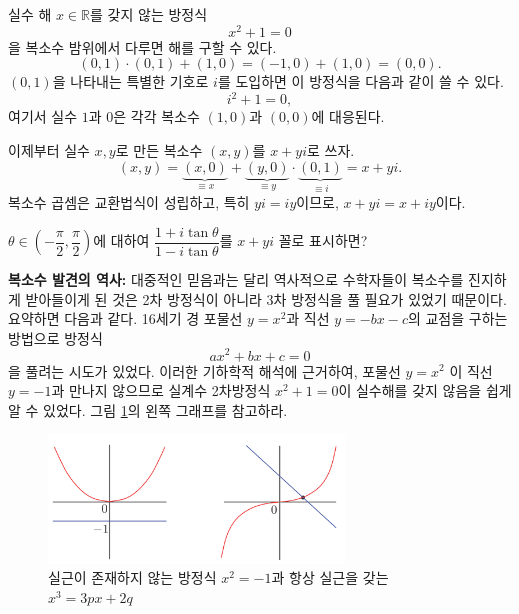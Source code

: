 실수 해 $x\in\mathbb R$를 갖지 않는 방정식
$$
x^2+1=0
$$
을 복소수 밤위에서 다루면 해를 구할 수 있다.
$$
(0,1)\cdot (0,1) + (1,0) = (-1,0) + (1,0) = (0,0).
$$
$(0,1)$을 나타내는 특별한 기호로 $i$를 도입하면 이 방정식을 다음과 같이 쓸 수 있다.
$$
i^2+1=0,
$$
여기서 실수 $1$과 $0$은 각각 복소수 $(1,0)$과 $(0,0)$에 대응된다.

이제부터 실수  $x,y$로 만든 복소수 $(x,y)$를 $x+yi$로 쓰자.
$$
(x,y) = \underbrace{(x,0)}_{\equiv x} +  \underbrace{(y,0)}_{\equiv y}
\cdot  \underbrace{(0,1)}_{\equiv i} = x+yi.
$$
복소수 곱셈은 교환법식이 성립하고, 특히 $yi = iy$이므로,
$x+yi = x+iy$이다.

\begin{salt_exercise} \label{ex-1-2}
$\theta \in \left(-\dfrac{\pi}2, \dfrac\pi2 \right)$에 대하여
$\dfrac{1+i\tan\theta}{1-i\tan\theta}$를 $x+yi$ 꼴로 표시하면?
\end{salt_exercise}

{\bf 복소수 발견의 역사: }
대중적인 믿음과는 달리 역사적으로 수학자들이 복소수를 진지하게 받아들이게 된 것은 
2차 방정식이 아니라 3차 방정식을 풀 필요가 있었기 때문이다. 
요약하면 다음과 같다.
16세기 경 포물선 $y=x^2$과 직선 $y=-bx-c$의 교점을 구하는  방법으로 
 방정식
$$
ax^2 + bx + c = 0
$$
을 풀려는 시도가 있었다. 
이러한 기하학적 해석에 근거하여,
포물선  $y=x^2$ 이 직선 $y=-1$과 만나지 않으므로
실계수 2차방정식 $x^2+1=0$이 실수해를 갖지 않음을 쉽게 알 수 있었다.
그림 \ref{fig-1-1}의 왼쪽 그래프를 참고하라.

\begin{figure}[!h]
\begin{center}
\includegraphics[width=0.7\textwidth]{./SaltChapter/figs/fig-1-1}
\end{center}
\caption{실근이 존재하지 않는 방정식 $x^2=-1$과 항상 실근을 갖는 $x^3=3px+2q$}
\label{fig-1-1}
\end{figure}

